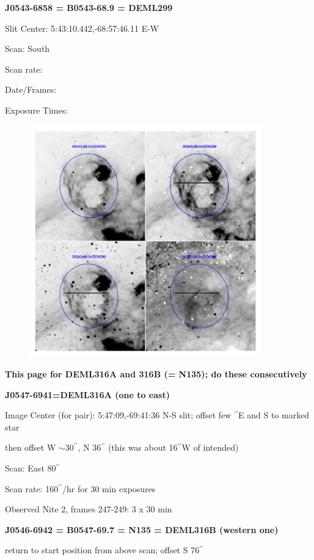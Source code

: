 \documentclass[11pt]{article}
\newcommand{\arcsec}{$^{\prime\prime}$}
\begin{document}
\newpage
{\bf J0543-6858 = B0543-68.9 = DEML299}  
 
Slit Center:  5:43:10.442,-68:57:46.11 E-W

Scan:  South

Scan rate:  

Date/Frames:

Exposure Times:  

\begin{figure}
\includegraphics[width=10.05cm]{snapshots/B0543-689.png}
\end{figure}

\newpage 
{\bf This page for DEML316A and 316B (= N135); do these consecutively}

 
{\bf J0547-6941=DEML316A  (one to east)}

Image Center (for pair):  5:47:09,-69:41:36  N-S slit; offset few \arcsec E and S to marked star

then offset W $\sim 30^{\prime\prime}$, N 36$^{\prime\prime}$   (this was about 16\arcsec W of intended)

Scan:  East 80$^{\prime\prime}$

Scan rate:  160$^{\prime\prime}$/hr for 30 min exposures

Observed Nite 2, frames 247-249:   3 x 30 min

{\bf J0546-6942 = B0547-69.7 = N135 = DEML316B (western one)}

return to start position from above scan; offset S 76$^{\prime\prime}$
\end{document}
